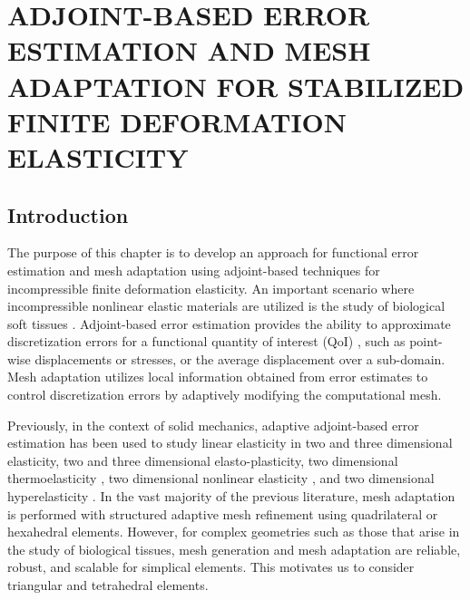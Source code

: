\chapter{ADJOINT-BASED ERROR ESTIMATION AND MESH ADAPTATION
FOR STABILIZED FINITE DEFORMATION ELASTICITY}
\label{chap:mech}

\let\thefootnote\relax{}

\section{Introduction}

The purpose of this chapter is to develop an approach for functional error
estimation and mesh adaptation using adjoint-based techniques for
incompressible finite deformation elasticity. An important scenario where
incompressible nonlinear elastic materials are utilized is the study of
biological soft tissues \cite{legant2010measurement, paszek2005tensional,
discher2005tissue}. Adjoint-based error estimation provides the ability
to approximate discretization errors for a functional quantity of interest
(QoI) \cite{venditti2000adjoint, becker2001optimal, giles2002adjoint,
peraire1998bounds, prudhomme1999goal, braack2003posteriori,
bangerth2013adaptive}, such as point-wise displacements or stresses, or the
average displacement over a sub-domain. Mesh adaptation utilizes local
information obtained from error estimates to control discretization
errors by adaptively modifying the computational mesh.

Previously, in the context of solid mechanics, adaptive adjoint-based error
estimation has been used to study linear elasticity in two
\cite{rannacher1997feed, stein2007error, gonzalez2014mesh} and three
\cite{ghorashi2014goal} dimensional elasticity, two
\cite{rannacher1998posteriori, rannacher1999posteriori} and three
\cite{ghorashi2017goal} dimensional elasto-plasticity, two dimensional
thermoelasticity \cite{rabizadeh2015adaptive}, two dimensional nonlinear
elasticity \cite{larsson2002strategies}, and two dimensional
hyperelasticity \cite{whiteley2014error}. In the vast majority of the
previous literature, mesh adaptation is performed with structured adaptive
mesh refinement using quadrilateral or hexahedral elements. However, for
complex geometries such as those that arise in the study of biological
tissues, mesh generation and mesh adaptation are reliable, robust, and
scalable for simplical elements. This motivates us to consider triangular and
tetrahedral elements.

